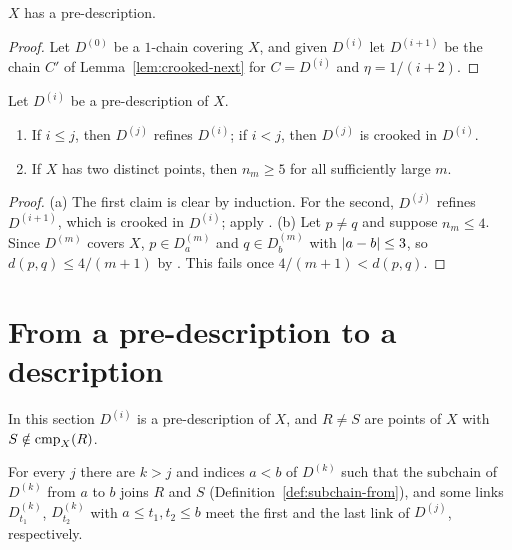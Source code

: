 
\begin{proposition}\label{prop:predesc-exists}
$X$ has a pre-description.
\end{proposition}

\begin{proof}
Let $D^{(0)}$ be a $1$-chain covering $X$, and given $D^{(i)}$ let $D^{(i+1)}$ be the chain $C'$ of Lemma~\ref{lem:crooked-next} for
$C=D^{(i)}$ and $\eta=1/(i+2)$.
\end{proof}


\begin{lemma}\label{lem:predesc-basic}
Let $D^{(i)}$ be a pre-description of $X$.
\begin{enumerate}[label=(\alph*)]
\item If $i\le j$, then $D^{(j)}$ refines $D^{(i)}$; if $i<j$, then $D^{(j)}$ is crooked in $D^{(i)}$.
\item If $X$ has two distinct points, then $n_m\ge5$ for all sufficiently large $m$.
\end{enumerate}
\end{lemma}

\begin{proof}
(a) The first claim is clear by induction. For the second, $D^{(j)}$ refines $D^{(i+1)}$, which is crooked in $D^{(i)}$; apply
. (b) Let $p\ne q$ and suppose $n_m\le4$. Since $D^{(m)}$ covers $X$, $p\in D^{(m)}_a$ and $q\in D^{(m)}_b$ with $\left\lvert a-b\right\rvert\le3$,
so $d(p,q)\le4/(m+1)$ by . This fails once $4/(m+1)<d(p,q)$.
\end{proof}


\section{From a pre-description to a description}\label{sec:desc-univ}

In this section $D^{(i)}$ is a pre-description of $X$, and $R\ne S$ are points of $X$ with $S\notin\operatorname{cmp}_{X}(R)$.

\begin{lemma}\label{lem:meets-ends}
For every $j$ there are $k>j$ and indices $a<b$ of $D^{(k)}$ such that the subchain of $D^{(k)}$ from $a$ to $b$ joins $R$ and $S$
(Definition~\ref{def:subchain-from}), and some links $D^{(k)}_{t_1}$, $D^{(k)}_{t_2}$ with $a\le t_1,t_2\le b$ meet the first and the last link
of $D^{(j)}$, respectively.
\end{lemma}


